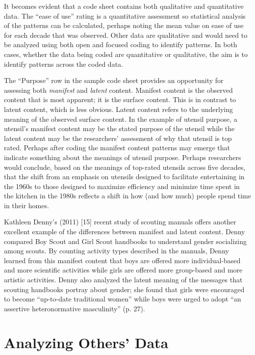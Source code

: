 It becomes evident that a code sheet contains both qualitative and quantitative data. The ``ease of use'' rating is a quantitative assessment so statistical analysis of the patterns can be calculated, perhaps noting the mean value on ease of use for each decade that was observed. Other data are qualitative and would need to be analyzed using both open and focused coding to identify patterns. In both cases, whether the data being coded are quantitative or qualitative, the aim is to identify patterns across the coded data.

The ``Purpose'' row in the sample code sheet provides an opportunity for assessing both \textit{manifest} and \textit{latent} content. Manifest content is the observed content that is most apparent; it is the surface content. This is in contrast to latent content, which is less obvious. Latent content refers to the underlying meaning of the observed surface content. In the example of utensil purpose, a utensil’s manifest content may be the stated purpose of the utensil while the latent content may be the researchers' assessment of why that utensil is top rated. Perhaps after coding the manifest content patterns may emerge that indicate something about the meanings of utensil purpose. Perhaps researchers would conclude, based on the meanings of top-rated utensils across five decades, that the shift from an emphasis on utensils designed to facilitate entertaining in the 1960s to those designed to maximize efficiency and minimize time spent in the kitchen in the 1980s reflects a shift in how (and how much) people spend time in their homes.

Kathleen Denny’s (2011) [15] recent study of scouting manuals offers another excellent example of the differences between manifest and latent content. Denny compared Boy Scout and Girl Scout handbooks to understand gender socializing among scouts. By counting activity types described in the manuals, Denny learned from this manifest content that boys are offered more individual-based and more scientific activities while girls are offered more group-based and more artistic activities. Denny also analyzed the latent meaning of the messages that scouting handbooks portray about gender; she found that girls were encouraged to become ``up-to-date traditional women'' while boys were urged to adopt ``an assertive heteronormative masculinity'' (p. 27).

\section{Analyzing Others' Data}

